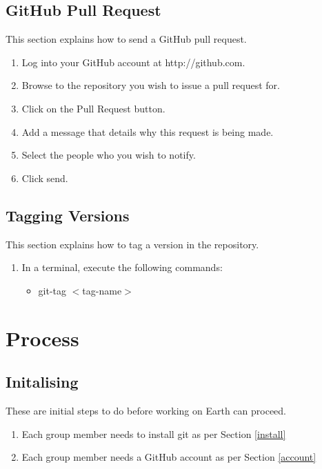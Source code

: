 \documentclass{article}
\begin{document}
\subsection{GitHub Pull Request}
\label{pull-req}
This section explains how to send a GitHub pull request.
\begin{enumerate}
	\item Log into your GitHub account at http://github.com.
	\item Browse to the repository you wish to issue a pull request for.
	\item Click on the Pull Request button.
	\item Add a message that details why this request is being made.
	\item Select the people who you wish to notify.
	\item Click send.
\end{enumerate}

\subsection{Tagging Versions}
\label{tag}
This section explains how to tag a version in the repository.
\begin{enumerate}
	\item In a terminal, execute the following commands:
	\begin{itemize}
		\item git-tag \(<\)tag-name\(>\)
	\end{itemize}
\end{enumerate}


\section{Process}

\subsection{Initalising}
These are initial steps to do before working on Earth can proceed.
\begin{enumerate}
	\item Each group member needs to install git as per Section \ref{install}
	\item Each group member needs a GitHub account as per Section \ref{account}
\end{enumerate}
\end{document}
